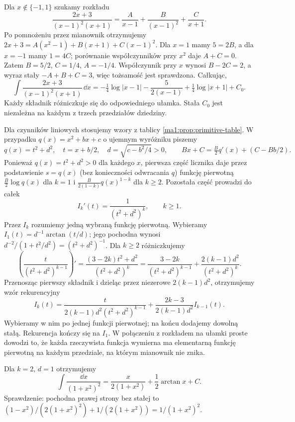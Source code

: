 \begin{przyklad}
\label{ma1:ex:partial-fractions}
Dla $x\notin\{-1,1\}$ szukamy rozkładu
\[
 \frac{2x+3}{(x-1)^2(x+1)}
 =\frac A{x-1}+\frac B{(x-1)^2}+\frac C{x+1}.
\]
Po pomnożeniu przez mianownik otrzymujemy
$2x+3=A(x^2-1)+B(x+1)+C(x-1)^2$.
Dla $x=1$ mamy $5=2B$, a dla $x=-1$ mamy $1=4C$; porównanie współczynników przy $x^2$ daje $A+C=0$. Zatem $B=5/2$, $C=1/4$, $A=-1/4$. Współczynnik przy $x$ wynosi $B-2C=2$, a wyraz stały $-A+B+C=3$, więc tożsamość jest sprawdzona. Całkując,
\[
 \int\frac{2x+3}{(x-1)^2(x+1)}\,\dd x
 =-\tfrac14\log|x-1|-\frac{5}{2(x-1)}
   +\tfrac14\log|x+1|+C_0.
\]
Każdy składnik różniczkuje się do odpowiedniego ułamka. Stała $C_0$ jest niezależna na każdym z trzech przedziałów dziedziny.
\end{przyklad}

Dla czynników liniowych stosujemy wzory z tablicy \ref{ma1:prop:primitive-table}. W przypadku $q(x)=x^2+bx+c$ o ujemnym wyróżniku piszemy
\[
 q(x)=t^2+d^2,\quad t=x+b/2,\quad d=\sqrt{c-b^2/4}>0,
 \qquad Bx+C=\tfrac B2 q'(x)+(C-Bb/2).
\]
Ponieważ $q(x)=t^2+d^2>0$ dla każdego $x$, pierwsza część licznika daje przez podstawienie $s=q(x)$ (bez konieczności odwracania $q$) funkcję pierwotną $\tfrac B2\log q(x)$ dla $k=1$ i $\tfrac B{2(1-k)}q(x)^{1-k}$ dla $k\ge2$. Pozostała część prowadzi do całek
\[
 I_k'(t)=\frac{1}{(t^2+d^2)^k},\qquad k\ge1.
\]
Przez $I_k$ rozumiemy jedną wybraną funkcję pierwotną. Wybieramy $I_1(t)=d^{-1}\arctan(t/d)$; jego pochodna wynosi $d^{-2}/(1+t^2/d^2)=(t^2+d^2)^{-1}$. Dla $k\ge2$ różniczkujemy
\[
 \left(\frac{t}{(t^2+d^2)^{k-1}}\right)'
 =\frac{(3-2k)t^2+d^2}{(t^2+d^2)^k}
 =\frac{3-2k}{(t^2+d^2)^{k-1}}
  +\frac{2(k-1)d^2}{(t^2+d^2)^k}.
\]
Przenosząc pierwszy składnik i dzieląc przez niezerowe $2(k-1)d^2$, otrzymujemy wzór rekurencyjny
\begin{equation}
 \label{ma1:eq:quadratic-reduction}
 I_k(t)=\frac{t}{2(k-1)d^2(t^2+d^2)^{k-1}}
 +\frac{2k-3}{2(k-1)d^2}I_{k-1}(t).
\end{equation}
Wybieramy w nim po jednej funkcji pierwotnej; na końcu dodajemy dowolną stałą. Rekurencja kończy się na $I_1$. W połączeniu z rozkładem na ułamki proste dowodzi to, że każda rzeczywista funkcja wymierna ma elementarną funkcję pierwotną na każdym przedziale, na którym mianownik nie znika.

\begin{przyklad}
\label{ma1:ex:quadratic-reduction}
Dla $k=2$, $d=1$ otrzymujemy
\[
 \int\frac{\dd x}{(1+x^2)^2}
 =\frac{x}{2(1+x^2)}+\frac12\arctan x+C.
\]
Sprawdzenie: pochodna prawej strony bez stałej to
$(1-x^2)/(2(1+x^2)^2)+1/(2(1+x^2))=1/(1+x^2)^2$.
\end{przyklad}

